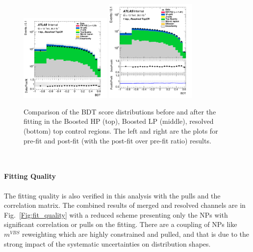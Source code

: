 \begin{figure}[!ht]
	\includegraphics[width=0.4\textwidth]{Chapter5/BDT_1lep_res_CRTop_prefit.pdf}
	\includegraphics[width=0.4\textwidth]{Chapter5/BDT_1lep_res_CRTop_postfit.pdf}	
	\caption{\label{Fig:data_mc_vbs_tcr}
             Comparison of the BDT score distributions before and after the fitting in the  
             Boosted HP (top), Boosted LP (middle), resolved (bottom) top control regions. The left and right are the plots for pre-fit and post-fit (with the post-fit over pre-fit ratio) results. 
	}
\end{figure}
\noindent
\\
\\{\bf Fitting Quality}
\\
\\The fitting quality is also verified in this analysis with the pulls and the correlation matrix. The combined results of merged and resolved channels are in Fig.~\ref{Fig:fit_quality} with a reduced scheme presenting only the NPs with significant correlation or pulls on the fitting. There are a coupling of NPs like $m^{VBS}$ reweighting which are highly constrained and pulled, and that is due to the strong impact of the systematic uncertainties on distribution shapes. 
